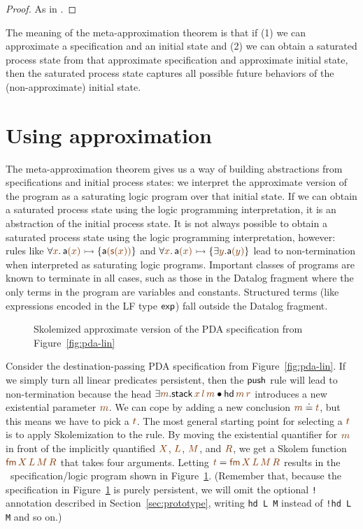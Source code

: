 \begin{proof}
As in \cite[Theorem 3]{simmons11logical}.
\end{proof}

The meaning of the meta-approximation theorem is that if (1) we can
approximate a specification and an initial state and (2) we can obtain
a saturated process state from that approximate specification
and approximate initial state, then the saturated process state captures
all possible future behaviors of the (non-approximate) initial state. 




\section{Using approximation}


The meta-approximation theorem gives us a way of building abstractions
from specifications and initial process states: we interpret the
approximate version of the program as a saturating logic program over
that initial state. If we can obtain a saturated process state using
the logic programming interpretation, it is an abstraction of the
initial process state. It is not always possible to obtain a saturated
process state using the logic programming interpretation, however:
rules like $\forall \lf{x}.\,{\sf a}\lf{(x)} \lefti \{ {\sf
  a}\lf{({\sf s}(x))} \}$ and $\forall \lf{x}.\,{\sf a}\lf{(x)} \lefti
\{ \exists \lf{y}. {\sf a}\lf{(y)} \}$ lead to non-termination when
interpreted as saturating logic programs. Important classes of
programs are known to terminate in all cases, such as those in the
Datalog fragment where the only terms in the program are variables and
constants. Structured terms (like expressions encoded in the LF type
${\sf exp}$) fall outside the Datalog fragment. 

\begin{figure}
\caption{Skolemized approximate version of the PDA specification from
Figure~\ref{fig:pda-lin}}
\label{fig:pda-pers}
\end{figure}

Consider the destination-passing PDA specification from
Figure~\ref{fig:pda-lin}. If we simply turn all linear predicates
persistent, then the ${\sf push}$ rule will lead to non-termination
because the head $\exists \lf{m}. {\sf stack}\,\lf{x}\,\lf{l}\,\lf{m}
\fuse {\sf hd}\,\lf{m}\,\lf{r}$ introduces a new existential parameter
$\lf{m}$.  We can cope by adding a new conclusion $\lf{m} \doteq
\lf{t}$, but this means we have to pick a $\lf{t}$.  The most general
starting point for selecting a $\lf{t}$ is to apply Skolemization to
the rule. By moving the existential quantifier for $\lf{m}$ in front
of the implicitly quantified $\lf{X}$, $\lf{L}$, $\lf{M}$, and
$\lf{R}$, we get a Skolem function $\lf{{\sf fm}\,X\,L\,M\,R}$ that
takes four arguments. Letting $\lf{t} = \lf{{\sf fm}\,X\,L\,M\,R}$
results in the \sls~specification/logic program shown in
Figure~\ref{fig:pda-pers}. (Remember that, because the specification in 
Figure~\ref{fig:pda-pers} is purely persistent, we will omit the
optional \verb|!| annotation described in Section~\ref{sec:prototype},
writing \verb|hd L M| instead of \verb|!hd L M| and so on.)

